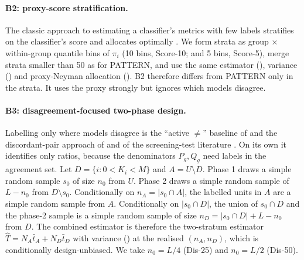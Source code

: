 \paragraph{B2: proxy-score stratification.} The classic approach to estimating a classifier's metrics with few labels stratifies on the classifier's score and allocates optimally \citep{bennett2010online,kumar2018classifier}. We form strata as group $\times$ within-group quantile bins of $\pi_i$ (10 bins, Score-10; and 5 bins, Score-5), merge strata smaller than 50 as for PATTERN, and use the same estimator (), variance () and proxy-Neyman allocation (). B2 therefore differs from PATTERN only in the strata. It uses the proxy strongly but ignores which models disagree.

\paragraph{B3: disagreement-focused two-phase design.} Labelling only where models disagree is the ``active $\neq$'' baseline of \citet{sawade2012active} and the discordant-pair approach of \citet{musgrove2023discordant} and of the screening-test literature \citep{pepe2001comparing}. On its own it identifies only ratios, because the denominators $P_g,Q_g$ need labels in the agreement set. Let $D=\{i:0<K_i<M\}$ and $A=U\setminus D$. Phase 1 draws a simple random sample $s_0$ of size $n_0$ from $U$. Phase 2 draws a simple random sample of $L-n_0$ from $D\setminus s_0$. Conditionally on $n_A=|s_0\cap A|$, the labelled units in $A$ are a simple random sample from $A$. Conditionally on $|s_0\cap D|$, the union of $s_0\cap D$ and the phase-2 sample is a simple random sample of size $n_D=|s_0\cap D|+L-n_0$ from $D$. The combined estimator is therefore the two-stratum estimator $\hat T=N_A\bar t_A+N_D\bar t_D$ with variance () at the realised $(n_A,n_D)$, which is conditionally design-unbiased. We take $n_0=L/4$ (Dis-25) and $n_0=L/2$ (Dis-50).

